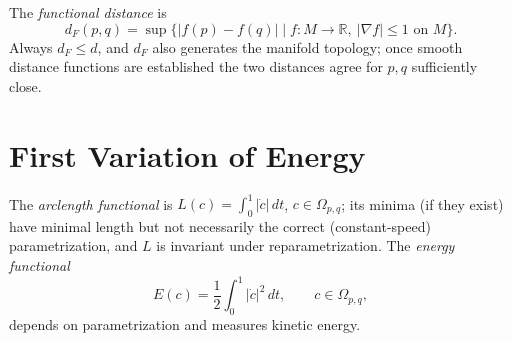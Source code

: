 \begin{definition}
  \label{def:pet-ch5-functional-distance}
  \leanok
  The \emph{functional distance} is
  \[
    d_F(p,q)=\sup\{|f(p)-f(q)|\mid f:M\to\mathbb R,\ |\nabla f|\le1\text{ on }M\}.
  \]
  Always $d_F\le d$, and $d_F$ also generates the manifold topology; once smooth
  distance functions are established the two distances agree for $p,q$ sufficiently
  close.
\end{definition}

\section{First Variation of Energy}

\begin{definition}
  \label{def:pet-ch5-energy-functional}
  \leanok
  The \emph{arclength functional} is $L(c)=\int_0^1|\dot c|\,dt$, $c\in\Omega_{p,q}$;
  its minima (if they exist) have minimal length but not necessarily the correct
  (constant-speed) parametrization, and $L$ is invariant under reparametrization. The
  \emph{energy functional}
  \[
    E(c)=\frac12\int_0^1|\dot c|^2\,dt,\qquad c\in\Omega_{p,q},
  \]
  depends on parametrization and measures kinetic energy.
\end{definition}

